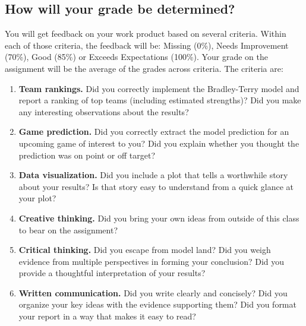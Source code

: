 \documentclass{article}
\begin{document}
    \subsection*{\sc How will your grade be determined?}

      You will get feedback on your work product based on several criteria. Within each of those criteria, the feedback will be: Missing (0\%), Needs Improvement (70\%), Good (85\%) or Exceeds Expectations (100\%). Your grade on the assignment will be the average of the grades across criteria. The criteria are:
      \begin{enumerate}
        \item {\bf Team rankings.} Did you correctly implement the Bradley-Terry model and report a ranking of top teams (including estimated strengths)? Did you make any interesting observations about the results?
        \item {\bf Game prediction.} Did you correctly extract the model prediction for an upcoming game of interest to you? Did you explain whether you thought the prediction was on point or off target?
        \item {\bf Data visualization.} Did you include a plot that tells a worthwhile story about your results? Is that story easy to understand from a quick glance at your plot?
        \item {\bf Creative thinking.} Did you bring your own ideas from outside of this class to bear on the assignment?
        \item {\bf Critical thinking.} Did you escape from model land? Did you weigh evidence from multiple perspectives in forming your conclusion? Did you provide a thoughtful interpretation of your results?
        \item {\bf Written communication.} Did you write clearly and concisely? Did you organize your key ideas with the evidence supporting them? Did you format your report in a way that makes it easy to read?
      \end{enumerate}
\end{document}

